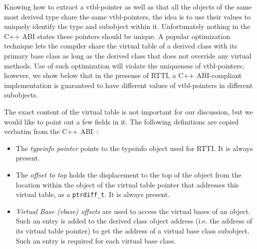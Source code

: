 \documentclass[preprint]{sigplanconf}
\makeatletter
\DeclareRobustCommand{\code}[1]{{\lstinline[breaklines=false,escapechar=@]{#1}}}
\makeatother
\begin{document}
\noindent
Knowing how to extract a vtbl-pointer as well as that all the objects of the 
same most derived type share the same vtbl-pointers, the idea is to use their 
values to uniquely identify the type and subobject within it. Unfortunately 
nothing in the C++ ABI states these pointers should be unique. A popular 
optimization technique lets the compiler share the virtual table of a derived 
class with its primary base class as long as the derived class that does not 
override any virtual methods. Use of such optimization will violate the 
uniqueness of vtbl-pointers; however, we show below that in the presense of 
RTTI, a C++ ABI-compliant implementation is guaranteed to have different values 
of vtbl-pointers in different subobjects.



The exact content of the virtual table is not important for our discussion, but 
we would like to point out a few fields in it. The following definitions are 
copied verbatim from the C++ ABI~\cite[.2]{C++ABI}:

\begin{itemize}
\setlength{\itemsep}{0pt}
\setlength{\parskip}{0pt}
\item The \emph{typeinfo pointer} points to the typeinfo object used for RTTI. 
      It is always present.  
\item The \emph{offset to top} holds the displacement to the top of the object 
      from the location within the object of the virtual table pointer that 
      addresses this virtual table, as a \code{ptrdiff_t}. It is always present.
\item \emph{Virtual Base (vbase) offsets} are used to access the virtual bases 
      of an object. Such an entry is added to the derived class object address 
      (i.e. the address of its virtual table pointer) to get the address of a 
      virtual base class subobject. Such an entry is required for each virtual 
      base class.
\end{itemize}
\end{document}
